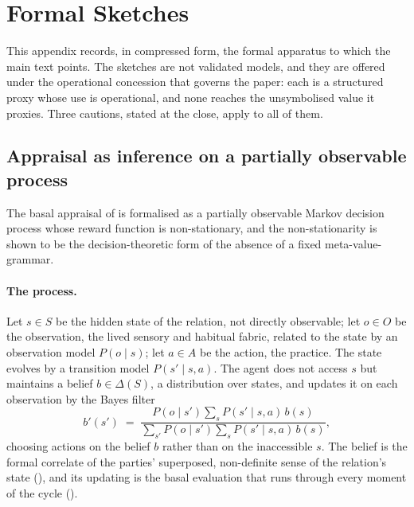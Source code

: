 \section{Formal Sketches}
\label{p11:sec:appendix}

\noindent
This appendix records, in compressed form, the formal apparatus to which the main text points. The sketches are not validated models, and they are offered under the operational concession that governs the paper: each is a structured proxy whose use is operational, and none reaches the unsymbolised value it proxies. Three cautions, stated at the close, apply to all of them.

\subsection{Appraisal as inference on a partially observable process}
\label{p11:sec:app-pomdp}

The basal appraisal of  is formalised as a partially observable Markov decision process whose reward function is non-stationary, and the non-stationarity is shown to be the decision-theoretic form of the absence of a fixed meta-value-grammar.

\paragraph{The process.}
Let $s \in S$ be the hidden state of the relation, not directly observable; let $o \in O$ be the observation, the lived sensory and habitual fabric, related to the state by an observation model $P(o \mid s)$; let $a \in A$ be the action, the practice. The state evolves by a transition model $P(s' \mid s, a)$. The agent does not access $s$ but maintains a belief $b \in \Delta(S)$, a distribution over states, and updates it on each observation by the Bayes filter
\[
b'(s') \;=\; \frac{P(o \mid s') \sum_{s} P(s' \mid s, a)\, b(s)}{\sum_{s'} P(o \mid s') \sum_{s} P(s' \mid s, a)\, b(s)} ,
\]
choosing actions on the belief $b$ rather than on the inaccessible $s$. The belief is the formal correlate of the parties' superposed, non-definite sense of the relation's state (), and its updating is the basal evaluation that runs through every moment of the cycle ().

